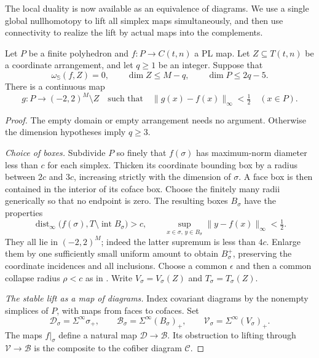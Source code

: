 The local duality is now available as an equivalence of diagrams.
We use a single global nullhomotopy to lift all simplex maps
simultaneously, and then use connectivity to realize the lift by
actual maps into the complements.

\begin{lemma}\label{lem:stable-avoidance}
Let $P$ be a finite polyhedron and $f:P\to C(t,n)$ a PL map.
Let $Z\subseteq T(t,n)$ be a coordinate arrangement, and let $q\ge1$
be an integer.  Suppose that
\[
 \omega_{\mathbb S}(f,Z)=0,\qquad
 \dim Z\le M-q,\qquad \dim P\le2q-5.
\]
There is a continuous map
\[
 g:P\longrightarrow(-2,2)^M\setminus Z
 \quad\text{such that}\quad
 \|g(x)-f(x)\|_\infty<\tfrac12\quad(x\in P).
\]
\end{lemma}

\begin{proof}
The empty domain or empty arrangement needs no argument.  Otherwise the
dimension hypotheses imply $q\ge3$.

\emph{Choice of boxes.}
Subdivide $P$ so finely that $f(\sigma)$ has maximum-norm diameter less
than $c$ for each simplex.  Thicken its coordinate bounding box by a
radius between $2c$ and $3c$, increasing strictly with the dimension of
$\sigma$.  A face box is then contained in the interior of its coface
box.  Choose the finitely many radii generically so that no endpoint is
zero.  The resulting boxes $B_\sigma$ have the properties
\begin{equation}\label{eq:avoidance-box-control}
 \operatorname{dist}_\infty
 \bigl(f(\sigma),T\setminus\operatorname{int}B_\sigma\bigr)>c,
 \qquad
 \sup_{x\in\sigma,\,y\in B_\sigma}\|y-f(x)\|_\infty<\tfrac12.
\end{equation}
They all lie in $(-2,2)^M$; indeed the latter supremum is less than
$4c$.  Enlarge them by one sufficiently small uniform amount to obtain
$B_\sigma^+$, preserving the coordinate incidences and all inclusions.
Choose a common $\epsilon$ and then a common collapse radius
$\rho<c$ as in .
Write $V_\sigma=V_\sigma(Z)$ and $T_\sigma=T_\sigma(Z)$.

\emph{The stable lift as a map of diagrams.}
Index covariant diagrams by the nonempty simplices of $P$, with maps
from faces to cofaces.  Set
\[
 \mathcal D_\sigma=\Sigma^\infty\sigma_+,
 \qquad \mathcal B_\sigma=\Sigma^\infty(B_\sigma)_+,
 \qquad \mathcal V_\sigma=\Sigma^\infty(V_\sigma)_+.
\]
The maps $f|_\sigma$ define a natural map
$\mathcal D\to\mathcal B$.  Its obstruction to lifting through
$\mathcal V\to\mathcal B$ is the composite to the cofiber diagram
$\mathcal C$.


\end{proof}
